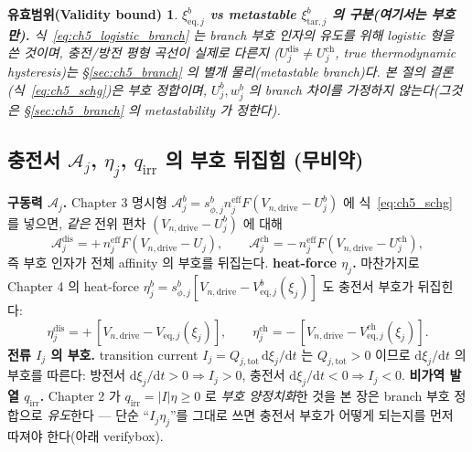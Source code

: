 \documentclass[11pt,a4paper]{article}
\newtheorem*{boundbox}{유효범위(Validity bound)}
\newcommand{\dd}{\mathrm{d}}
\newcommand{\eff}{\mathrm{eff}}
\newcommand{\eq}{\mathrm{eq}}
\newcommand{\drive}{\mathrm{drive}}
\newcommand{\tot}{\mathrm{tot}}
\newcommand{\irr}{\mathrm{irr}}
\newcommand{\dis}{\mathrm{dis}}
\newcommand{\chg}{\mathrm{ch}}
\newcommand{\tar}{\mathrm{tar}}
\begin{document}
\begin{boundbox}
\textbf{$\xi_{\eq,j}^b$ vs metastable $\xi_{\tar,j}^b$ 의 구분(여기서는 부호만).} 식~\eqref{eq:ch5_logistic_branch}
는 \emph{branch 부호 인자의 유도}를 위해 logistic 형을 쓴 것이며, 충전/방전 평형 곡선이 \emph{실제로 다른지}
($U_j^\dis\ne U_j^\chg$, true thermodynamic hysteresis)는 \S\ref{sec:ch5_branch} 의 별개 물리(metastable
branch)다. 본 절의 결론(식~\eqref{eq:ch5_schg})은 \emph{부호 정합}이며, $U_j^b,w_j^b$ 의 branch 차이를
가정하지 않는다(그것은 \S\ref{sec:ch5_branch} 의 metastability 가 정한다).
\end{boundbox}

\subsection{충전서 $\mathcal A_j$, $\eta_j$, $q_\irr$ 의 부호 뒤집힘 (무비약)}\label{sec:ch5_sign_flip}
\textbf{구동력 $\mathcal A_j$.} Chapter 3 명시형 $\mathcal A_j^b=s_{\phi,j}^b n_j^{\eff}F(V_{n,\drive}-U_j^b)$
에 식~\eqref{eq:ch5_schg} 를 넣으면, \emph{같은} 전위 편차 $(V_{n,\drive}-U_j^b)$ 에 대해
\begin{equation}
\mathcal A_j^\dis=+\,n_j^{\eff}F(V_{n,\drive}-U_j),\qquad
\mathcal A_j^\chg=-\,n_j^{\eff}F(V_{n,\drive}-U_j^\chg),
\label{eq:ch5_A_branch}
\end{equation}
즉 부호 인자가 전체 affinity 의 부호를 뒤집는다. \textbf{heat-force $\eta_j$.} 마찬가지로 Chapter 4 의
heat-force $\eta_j^b=s_{\phi,j}^b[V_{n,\drive}-V_{\eq,j}^b(\xi_j)]$ 도 충전서 부호가 뒤집힌다:
\begin{equation}
\eta_j^\dis=+\,[V_{n,\drive}-V_{\eq,j}(\xi_j)],\qquad
\eta_j^\chg=-\,[V_{n,\drive}-V_{\eq,j}^\chg(\xi_j)].
\label{eq:ch5_eta_branch}
\end{equation}
\textbf{전류 $I_j$ 의 부호.} transition current $I_j=Q_{j,\tot}\,\dd\xi_j/\dd t$ 는 $Q_{j,\tot}>0$ 이므로
$\dd\xi_j/\dd t$ 의 부호를 따른다: 방전서 $\dd\xi_j/\dd t>0\Rightarrow I_j>0$, 충전서 $\dd\xi_j/\dd t<0\Rightarrow
I_j<0$. \textbf{비가역 발열 $q_\irr$.} Chapter 2 가 $q_\irr=|I|\eta\ge0$ 로 \emph{부호 양정치화}한 것을 본 장은
branch 부호 정합으로 \emph{유도}한다 — 단순 ``$I_j\eta_j$''를 그대로 쓰면 충전서 부호가 어떻게 되는지를 먼저
따져야 한다(아래 verifybox).
\end{document}
